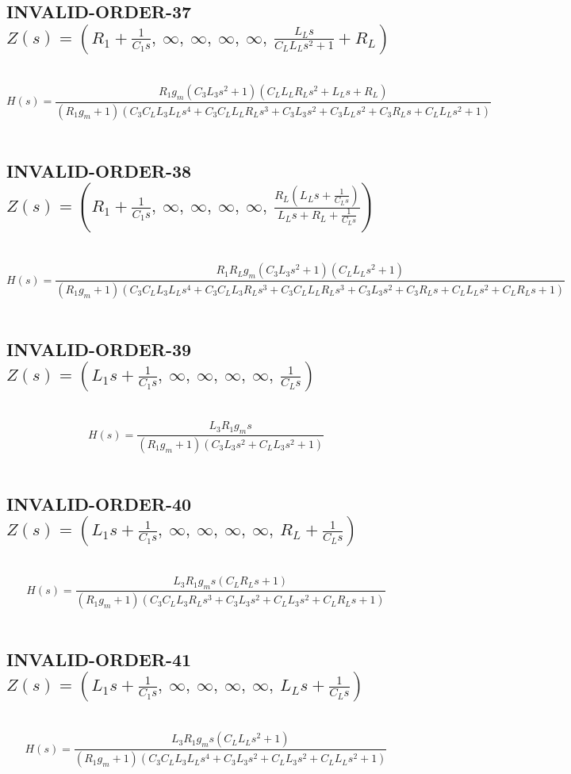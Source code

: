 \documentclass{article}
\begin{document}
\subsection{INVALID-ORDER-37 $Z(s) = \left( R_{1} + \frac{1}{C_{1} s}, \  \infty, \  \infty, \  \infty, \  \infty, \  \frac{L_{L} s}{C_{L} L_{L} s^{2} + 1} + R_{L}\right)$ } \ 
\textbf{\[H(s) = \frac{R_{1} g_{m} \left(C_{3} L_{3} s^{2} + 1\right) \left(C_{L} L_{L} R_{L} s^{2} + L_{L} s + R_{L}\right)}{\left(R_{1} g_{m} + 1\right) \left(C_{3} C_{L} L_{3} L_{L} s^{4} + C_{3} C_{L} L_{L} R_{L} s^{3} + C_{3} L_{3} s^{2} + C_{3} L_{L} s^{2} + C_{3} R_{L} s + C_{L} L_{L} s^{2} + 1\right)}\] } \ 
\subsection{INVALID-ORDER-38 $Z(s) = \left( R_{1} + \frac{1}{C_{1} s}, \  \infty, \  \infty, \  \infty, \  \infty, \  \frac{R_{L} \left(L_{L} s + \frac{1}{C_{L} s}\right)}{L_{L} s + R_{L} + \frac{1}{C_{L} s}}\right)$ } \ 
\textbf{\[H(s) = \frac{R_{1} R_{L} g_{m} \left(C_{3} L_{3} s^{2} + 1\right) \left(C_{L} L_{L} s^{2} + 1\right)}{\left(R_{1} g_{m} + 1\right) \left(C_{3} C_{L} L_{3} L_{L} s^{4} + C_{3} C_{L} L_{3} R_{L} s^{3} + C_{3} C_{L} L_{L} R_{L} s^{3} + C_{3} L_{3} s^{2} + C_{3} R_{L} s + C_{L} L_{L} s^{2} + C_{L} R_{L} s + 1\right)}\] } \ 
\subsection{INVALID-ORDER-39 $Z(s) = \left( L_{1} s + \frac{1}{C_{1} s}, \  \infty, \  \infty, \  \infty, \  \infty, \  \frac{1}{C_{L} s}\right)$ } \ 
\textbf{\[H(s) = \frac{L_{3} R_{1} g_{m} s}{\left(R_{1} g_{m} + 1\right) \left(C_{3} L_{3} s^{2} + C_{L} L_{3} s^{2} + 1\right)}\] } \ 
\subsection{INVALID-ORDER-40 $Z(s) = \left( L_{1} s + \frac{1}{C_{1} s}, \  \infty, \  \infty, \  \infty, \  \infty, \  R_{L} + \frac{1}{C_{L} s}\right)$ } \ 
\textbf{\[H(s) = \frac{L_{3} R_{1} g_{m} s \left(C_{L} R_{L} s + 1\right)}{\left(R_{1} g_{m} + 1\right) \left(C_{3} C_{L} L_{3} R_{L} s^{3} + C_{3} L_{3} s^{2} + C_{L} L_{3} s^{2} + C_{L} R_{L} s + 1\right)}\] } \ 
\subsection{INVALID-ORDER-41 $Z(s) = \left( L_{1} s + \frac{1}{C_{1} s}, \  \infty, \  \infty, \  \infty, \  \infty, \  L_{L} s + \frac{1}{C_{L} s}\right)$ } \ 
\textbf{\[H(s) = \frac{L_{3} R_{1} g_{m} s \left(C_{L} L_{L} s^{2} + 1\right)}{\left(R_{1} g_{m} + 1\right) \left(C_{3} C_{L} L_{3} L_{L} s^{4} + C_{3} L_{3} s^{2} + C_{L} L_{3} s^{2} + C_{L} L_{L} s^{2} + 1\right)}\] } \ 
\end{document}
